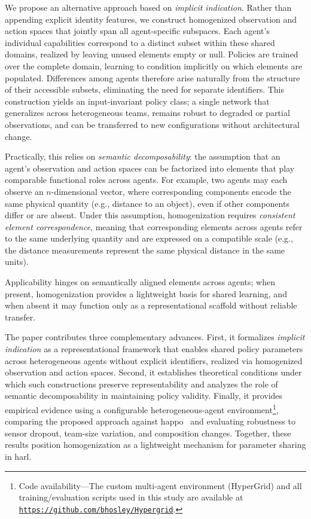 \documentclass[]{jair}
\begin{document}
We propose an alternative approach based on \emph{implicit indication}. 
Rather than appending explicit identity features, we construct homogenized 
observation and action spaces that jointly span all agent-specific subspaces. 
Each agent's individual capabilities correspond to a distinct subset within 
these shared domains, realized by leaving unused elements empty or null. 
Policies are trained over the complete domain, 
learning to condition implicitly on which elements are populated. 
Differences among agents therefore arise naturally from the structure of 
their accessible subsets, eliminating the need for separate identifiers. 
This construction yields an input-invariant policy class;
a single network that generalizes across heterogeneous teams, 
remains robust to degraded or partial observations, 
and can be transferred to new configurations without architectural change.

Practically, this relies on \emph{semantic decomposability}: 
the assumption that an agent's observation and action spaces can be factorized
into elements that play comparable functional roles across agents.
For example, two agents may each observe an \(n\)-dimensional vector, 
where corresponding components encode the same physical quantity 
(e.g., distance to an object), even if other components differ or are absent.
Under this assumption, homogenization requires \emph{consistent element correspondence},
meaning that corresponding elements across agents refer to the same underlying quantity
and are expressed on a compatible scale (e.g., the distance measurements represent
the same physical distance in the same units).

Applicability hinges on semantically aligned elements across agents; when present, 
homogenization provides a lightweight basis for shared learning, and when 
absent it may function only as a representational scaffold without reliable transfer.

The paper contributes three complementary advances. 
First, it formalizes \emph{implicit indication} as a representational framework that enables
shared policy parameters across heterogeneous agents without explicit identifiers, realized
via homogenized observation and action spaces.
Second, it establishes theoretical conditions under which such constructions preserve 
representability and analyzes the role of semantic decomposability in maintaining policy validity. 
Finally, it provides empirical evidence using a configurable heterogeneous-agent 
environment\footnote{
    Code availability---The custom multi-agent environment (HyperGrid) 
    and all training/evaluation scripts used in this study are available at 
    \href{https://github.com/bhosley/Hypergrid}{\texttt{https://github.com/bhosley/Hypergrid}}.
}, 
comparing the proposed approach against \gls{happo}~\cite{zhong2024} and 
evaluating robustness to sensor dropout, team-size variation, and composition changes. 
Together, these results position homogenization as a lightweight mechanism 
for parameter sharing in \gls{harl}.
\end{document}
